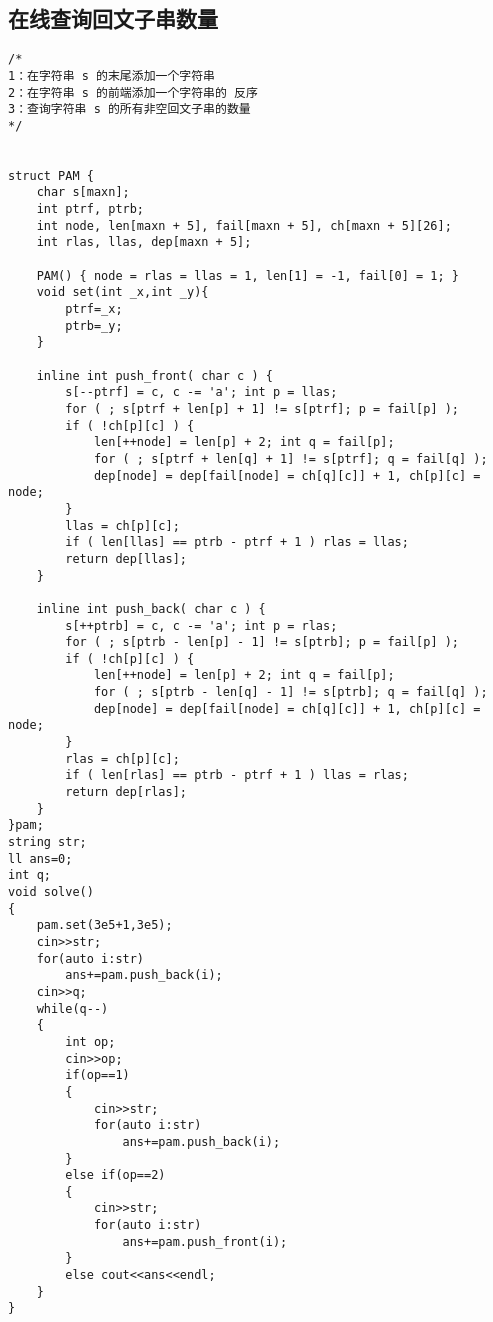 \documentclass[12pt, a4paper, oneside]{ctexart}
\begin{document}
\newpage
\subsection{在线查询回文子串数量} 
\begin{lstlisting}
/*
1：在字符串 s 的末尾添加一个字符串
2：在字符串 s 的前端添加一个字符串的 反序
3：查询字符串 s 的所有非空回文子串的数量
*/


struct PAM {
	char s[maxn];
	int ptrf, ptrb;
    int node, len[maxn + 5], fail[maxn + 5], ch[maxn + 5][26];
    int rlas, llas, dep[maxn + 5];

    PAM() { node = rlas = llas = 1, len[1] = -1, fail[0] = 1; }
    void set(int _x,int _y){
    	ptrf=_x;
    	ptrb=_y;
    }

    inline int push_front( char c ) {
        s[--ptrf] = c, c -= 'a'; int p = llas;
        for ( ; s[ptrf + len[p] + 1] != s[ptrf]; p = fail[p] );
        if ( !ch[p][c] ) {
            len[++node] = len[p] + 2; int q = fail[p];
            for ( ; s[ptrf + len[q] + 1] != s[ptrf]; q = fail[q] );
            dep[node] = dep[fail[node] = ch[q][c]] + 1, ch[p][c] = node;
        }
        llas = ch[p][c];
        if ( len[llas] == ptrb - ptrf + 1 ) rlas = llas;
        return dep[llas];
    }

    inline int push_back( char c ) {
        s[++ptrb] = c, c -= 'a'; int p = rlas;
        for ( ; s[ptrb - len[p] - 1] != s[ptrb]; p = fail[p] );
        if ( !ch[p][c] ) {
            len[++node] = len[p] + 2; int q = fail[p];
            for ( ; s[ptrb - len[q] - 1] != s[ptrb]; q = fail[q] );
            dep[node] = dep[fail[node] = ch[q][c]] + 1, ch[p][c] = node;
        }
        rlas = ch[p][c];
        if ( len[rlas] == ptrb - ptrf + 1 ) llas = rlas;
        return dep[rlas];
    }
}pam;
string str;
ll ans=0;
int q;
void solve()
{
	pam.set(3e5+1,3e5);
	cin>>str;
	for(auto i:str)
		ans+=pam.push_back(i);
	cin>>q;
	while(q--)
	{
		int op;
		cin>>op;
		if(op==1)
		{
			cin>>str;
			for(auto i:str)
				ans+=pam.push_back(i);
		}
		else if(op==2)
		{
			cin>>str;
			for(auto i:str)
				ans+=pam.push_front(i);
		}
		else cout<<ans<<endl;
	}
}
\end{lstlisting}
\end{document}
